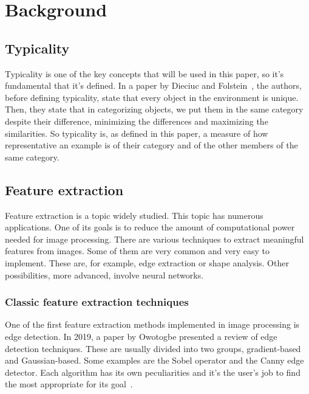 \documentclass[conference]{IEEEtran}
\begin{document}
	\section{Background}
	
		\subsection{Typicality}
		
			\noindent Typicality is one of the key concepts that will be used in this paper, so it's fundamental that it's defined. In a paper by Dieciuc and Folstein~\cite{dieciuc2019typicality},
			the authors, before defining typicality, state that every object in the environment is unique. Then, they state that in categorizing objects, we put them in the same category 
			despite their difference, minimizing the differences and maximizing the similarities. So typicality is, as defined in this paper, a measure of how representative 
			an example is of their category and of the other members of the same category. 
			

		\subsection{Feature extraction\label{sec:bfe}}

			\noindent Feature extraction is a topic widely studied. 
			This topic has numerous applications. 
			One of its goals is to reduce the amount of computational power needed for image processing. 
			There are various techniques to extract meaningful features from images. 
			Some of them are very common and very easy to implement. 
			These are, for example, edge extraction or shape analysis. 
			Other possibilities, more advanced, involve neural networks.\\

				\subsubsection{Classic feature extraction techniques}
					
					One of the first feature extraction methods implemented in image processing is edge detection.				
					In 2019, a paper by Owotogbe presented a review of edge detection techniques. 
					These are usually divided into two groups, gradient-based and Gaussian-based. 
					Some examples are the Sobel operator and the Canny edge detector. 
					Each algorithm has its own peculiarities and it's the user's job to find 
					the most appropriate for its goal~\cite{owotogbe2019edge}.\\
					
\end{document}
